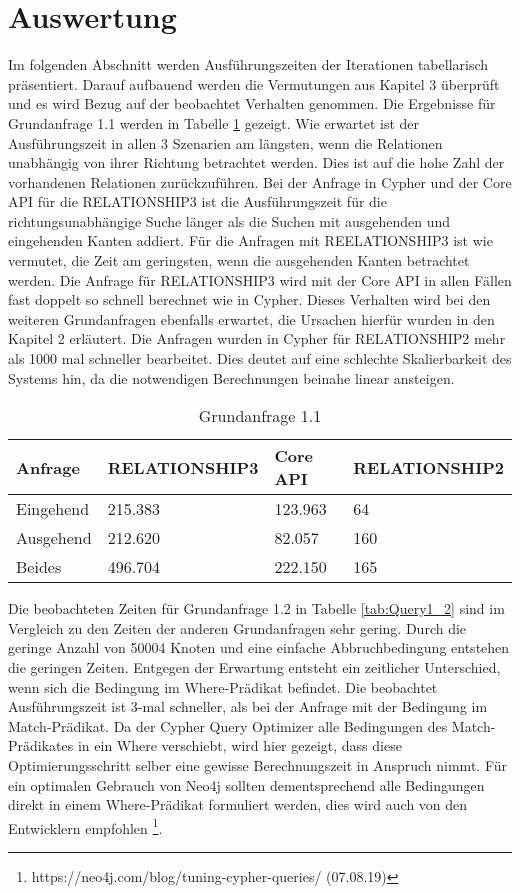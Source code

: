 \section{Auswertung}
Im folgenden Abschnitt werden Ausführungszeiten der Iterationen tabellarisch präsentiert.  Darauf aufbauend werden die Vermutungen aus Kapitel 3 überprüft und es wird Bezug auf der beobachtet Verhalten genommen. \newline \newline
Die Ergebnisse für Grundanfrage 1.1 werden  in Tabelle \ref{tab:Query1_1} gezeigt. Wie erwartet ist der Ausführungszeit in allen 3 Szenarien am längsten, wenn die Relationen unabhängig von ihrer Richtung betrachtet werden. Dies ist auf die hohe Zahl der vorhandenen Relationen zurückzuführen. Bei der Anfrage in Cypher und der Core API für die RELATIONSHIP3  ist die Ausführungszeit für die richtungsunabhängige Suche länger als die Suchen mit ausgehenden und eingehenden Kanten addiert. Für die Anfragen mit REELATIONSHIP3 ist wie vermutet, die Zeit am geringsten, wenn die ausgehenden Kanten betrachtet werden. \newline
Die Anfrage für RELATIONSHIP3 wird mit der Core API in  allen Fällen fast doppelt so schnell berechnet wie in Cypher. Dieses Verhalten wird bei den weiteren Grundanfragen ebenfalls erwartet, die Ursachen hierfür wurden in den Kapitel 2 erläutert. \newline
Die Anfragen wurden in Cypher für RELATIONSHIP2 mehr als 1000 mal schneller bearbeitet. Dies deutet auf eine schlechte Skalierbarkeit des Systems hin, da die notwendigen Berechnungen beinahe linear ansteigen. 
\FloatBarrier  
\begin{table}[h]
\centering
\begin{tabular}{ |p{3cm}||p{3cm}|p{3cm}|p{3cm}|  }
	\hline
	Anfrage& RELATIONSHIP3 &Core API&RELATIONSHIP2\\
	\hline
	Eingehend   & 215.383    &123.963&  64\\
	Ausgehend&    212.620  & 82.057   & 160\\
	Beides&496.704 & 222.150&  165\\
	\hline
\end{tabular}
\caption{Grundanfrage 1.1}
\label{tab:Query1_1}
\end{table}
\FloatBarrier
 Die beobachteten Zeiten für Grundanfrage 1.2 in Tabelle \ref{tab:Query1_2} sind im Vergleich zu den Zeiten der anderen Grundanfragen sehr gering. Durch die geringe Anzahl von 50004 Knoten und eine einfache Abbruchbedingung entstehen die geringen Zeiten. \newline Entgegen der Erwartung entsteht ein zeitlicher Unterschied, wenn sich die Bedingung im Where-Prädikat befindet. Die beobachtet Ausführungszeit ist 3-mal schneller, als bei der Anfrage mit der Bedingung im Match-Prädikat. Da der Cypher Query Optimizer alle Bedingungen des Match-Prädikates in ein Where verschiebt, wird hier gezeigt, dass diese Optimierungsschritt selber eine gewisse Berechnungszeit in Anspruch nimmt. Für ein optimalen Gebrauch von Neo4j sollten dementsprechend alle Bedingungen direkt in einem Where-Prädikat formuliert werden, dies wird auch von den Entwicklern empfohlen \footnote{https://neo4j.com/blog/tuning-cypher-queries/ (07.08.19)}. \newline

